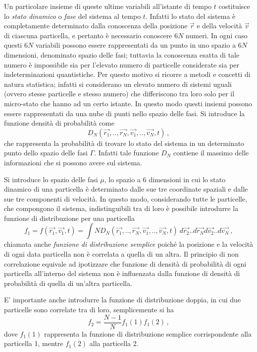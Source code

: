 Un particolare insieme di queste ultime variabili all'istante di tempo $t$ 
costituisce lo \textit{stato dinamico} o \textit{fase} del sistema al tempo $t$.
Infatti lo stato del sistema è completamente determinato dalla conoscenza della 
posizione $\vec{r}$ e della velocità $\vec{v}$ di ciascuna particella, e 
pertanto è necessario conoscere $6N$ numeri. 
In ogni caso questi $6N$ variabili possono essere rappresentati da un punto in 
uno spazio a $6N$ dimensioni, denominato spazio delle fasi; tuttavia la 
conoscenza esatta di tale numero è impossibile sia per l'elevato numero di 
particelle considerate sia per indeterminazioni quantistiche.
Per questo motivo si ricorre a metodi e concetti di natura statistica; infatti 
si considerano un elevato numero di sistemi uguali (ovvero stesse particelle e 
stesso numero) che differiscono tra loro solo per il micro-stato che hanno ad un 
certo istante. In questo modo questi insiemi possono essere rappresentati da una 
nube di punti nello spazio delle fasi. 
Si introduce la funzione densità di probabilità come
\begin{equation}
D_N (\vec{r_1},..,\vec{r_N}, \vec{v_1},..,\vec{v_N},t) \,,
\end{equation}
che rappresenta la probabilità di trovare lo stato del sistema in un determinato 
punto dello spazio delle fasi $\Gamma$. Infatti tale funzione $D_N$ contiene il 
massimo delle informazioni che si possono avere sul sistema.

Si introduce lo spazio delle fasi $\mu$, lo spazio a 6 dimensioni in cui lo stato 
dinamico di una particella è determinato dalle sue tre coordinate spaziali e 
dalle sue tre componenti di velocità. In questo modo, considerando tutte le 
particelle, che compongono il sistema, indistinguibili tra di loro è possibile 
introdurre la funzione di distribuzione per una particella
\begin{equation}
f_1=f(\vec{r_1},\vec{v_1},t)=\int N D_N(\vec{r_1},..,\vec{r_N}, 
\vec{v_1},..,\vec{v_N},t)\: d\vec{r_2}..d\vec{r_N}d\vec{v_2}..d\vec{v_N} \,,
\end{equation}
chiamata anche \textit{funzione di distribuzione semplice} poiché la posizione e la 
velocità di ogni data particella non è correlata a quella di un altra. Il 
principio di non correlazione equivale ad ipotizzare che funzione di densità di 
probabilità di ogni particella all'interno del sistema non è influenzata dalla 
funzione di densità di probabilità di quella di un'altra particella.

E' importante anche introdurre la funzione di distribuzione doppia, in cui due 
particelle sono correlate tra di loro,  semplicemente si ha
\begin{equation}
f_2 =\frac{N-1}{N}f_1(1)f_1(2) \,,
\end{equation}
dove $f_1(1)$ rappresenta la funzione di distribuzione semplice corrispondente 
alla particella 1, mentre $f_1(2)$ alla particella 2.


